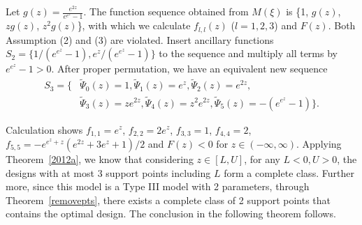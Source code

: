 \documentclass[12pt]{amsart}
\theoremstyle{definition}
\theoremstyle{remark}
\numberwithin{equation}{section}
\begin{document}

Let $g(z) =  \frac{e^{2z}}{e^{e^z}-1}$. The function sequence obtained from $M(\xi)$ is \{1, $g(z)$, $zg(z)$,  $z^2g(z)$\}, with which we calculate $f_{l,l}(z)$ ($l=1,2,3$) and $F(z)$. Both Assumption (2) and (3) are violated. Insert ancillary functions $S_2 = \{1/(e^{e^z}-1),e^z/(e^{e^z}-1)\}$ to the sequence and multiply all terms by $e^{e^z}-1>0$. After proper permutation, we have an equivalent new sequence 
\begin{align*}
    S_3  = \{&\tilde{\Psi}_0(z) = 1, \tilde{\Psi}_1(z) = e^z,\tilde{\Psi}_2(z) = e^{2z}, \\
    &\tilde{\Psi}_3(z) =ze^{2z},\tilde{\Psi}_4(z) = z^2e^{2z}, \tilde{\Psi}_5(z) = -(e^{e^z}-1)\}.
\end{align*} 

Calculation shows $f_{1,1} = e^z$, $f_{2,2} =2e^z$, $f_{3,3} = 1$, $f_{4,4} = 2$, $f_{5,5} =- e^{e^z+z}(e^{2z}+3e^z+1)/2$ and $F(z)<0$ for $z\in(-\infty,\infty)$. Applying Theorem~\ref{2012a}, we know that considering $z\in[L,U]$, for any $L<0, U>0$, the designs with at most 3 support points including $L$ form a complete class. Further more, since this model is a Type III model with 2 parameters, through Theorem~\ref{removepts}, there exists a complete class of 2 support points that contains the optimal design. The conclusion in the following theorem follows.
\end{document}
